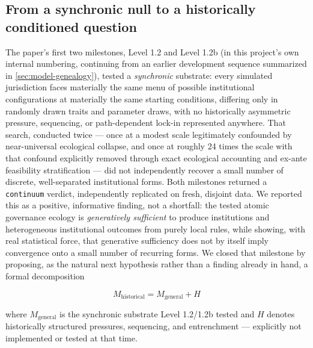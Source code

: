 \subsection{From a synchronic null to a historically conditioned question}
\label{sec:intro-synchronic-to-historical}

The paper's first two milestones, Level 1.2 and Level 1.2b (in this
project's own internal numbering, continuing from an earlier development
sequence summarized in \cref{sec:model-genealogy}), tested a
\textit{synchronic} substrate: every simulated jurisdiction faces
materially the same menu of possible institutional configurations at
materially the same starting conditions, differing only in randomly drawn
traits and parameter draws, with no historically asymmetric pressure,
sequencing, or path-dependent lock-in represented anywhere. That search,
conducted twice --- once at a modest scale legitimately confounded by
near-universal ecological collapse, and once at roughly 24 times the scale
with that confound explicitly removed through exact ecological accounting
and ex-ante feasibility stratification --- did not independently recover a
small number of discrete, well-separated institutional forms. Both
milestones returned a \texttt{continuum} verdict, independently replicated
on fresh, disjoint data. We reported this as a positive, informative
finding, not a shortfall: the tested atomic governance ecology is
\textit{generatively sufficient} to produce institutions and heterogeneous
institutional outcomes from purely local rules, while showing, with real
statistical force, that generative sufficiency does not by itself imply
convergence onto a small number of recurring forms. We closed that
milestone by proposing, as the natural next hypothesis rather than a
finding already in hand, a formal decomposition

\begin{equation}
M_{\text{historical}} = M_{\text{general}} + H
\label{eq:historical-decomposition-intro}
\end{equation}

where $M_{\text{general}}$ is the synchronic substrate Level 1.2/1.2b
tested and $H$ denotes historically structured pressures, sequencing, and
entrenchment --- explicitly not implemented or tested at that time.

